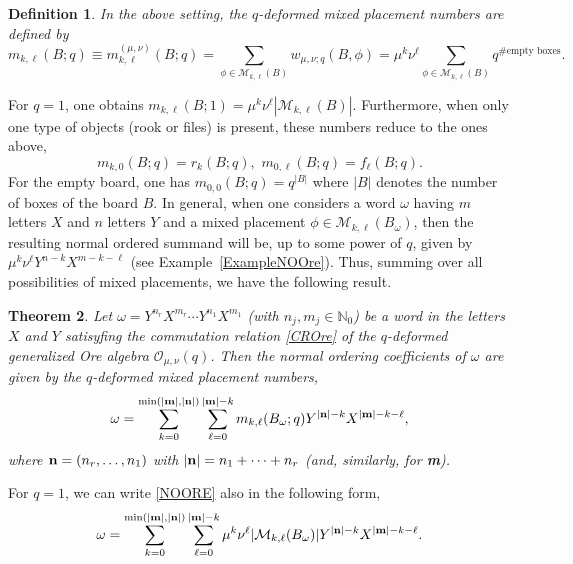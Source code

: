 \documentclass[10pt]{amsart}
\newtheorem{theorem}{Theorem}[section]%
\newtheorem{definition}[theorem]{Definition}
\begin{document}
\begin{definition}\label{DefOREMPN}
In the above setting, the {\em $q$-deformed mixed placement numbers} are defined by 
\begin{equation}
m_{k,\ell}(B;q)\equiv m_{k,\ell}^{(\mu,\nu)}(B;q)=\sum_{\phi \in \mathcal{M}_{k,\ell}(B)} w_{\mu,\nu;q}(B,\phi)=\mu^{k}\nu^{\ell}\sum_{\phi \in \mathcal{M}_{k,\ell}(B)} q^{\# \mbox{empty boxes}}.
\end{equation}
\end{definition}
For $q=1$, one obtains $ m_{k,\ell}(B;1)=\mu^{k}\nu^{\ell} |{\mathcal M}_{k,\ell}(B)| $. Furthermore, when only one type of objects (rook or files) is present, these numbers reduce to the ones above,
\begin{equation}\label{ORERed}
m_{k,0}(B;q)=r_k(B;q), \,\, m_{0,\ell}(B;q)=f_{\ell}(B;q).
\end{equation}
For the empty board, one has $m_{0,0}(B;q)=q^{|B|}$ where $|B|$ denotes the number of boxes of the board $B$. In general, when one considers a word $\omega$ having $m$ letters $X$ and $n$ letters $Y$ and a mixed placement $\phi \in  \mathcal{M}_{k,\ell}(B_{\omega}) $, then the resulting normal ordered summand will be, up to some power of $q$, given by $\mu^k \nu^{\ell}Y^{n-k}X^{m-k-\ell}$ (see Example~\ref{ExampleNOOre}). Thus, summing over all possibilities of mixed placements, we have the following result.
\begin{theorem}\label{THNOORE} Let $\omega=Y^{n_r}X^{m_r}\cdots Y^{n_1}X^{m_1}$ (with $n_j,m_j \in \mathbb{N}_0$) be a word in the letters $X$ and $Y$ satisyfing the commutation relation \eqref{CROre} of the $q$-deformed generalized Ore algebra ${\mathcal O}_{\mu,\nu}(q)$. Then the normal ordering coefficients of $\omega$ are given by the $q$-deformed mixed placement numbers,
\begin{equation}\label{NOORE}
\omega = \sum_{k=0}^{\min (|{\bf m}|,|{\bf n}|)}\sum_{\ell=0}^{|{\bf m}|-k} m_{k,\ell}(B_{\omega};q) Y^{|{\bf n}|-k}X^{|{\bf m}|-k-\ell},
\end{equation}
where ${\bf n}=(n_r,\ldots,n_1)$ with $|{\bf n}|=n_1+\cdots+n_r$ (and, similarly, for {\bf m}). 
\end{theorem}
For $q=1$, we can write \eqref{NOORE} also in the following form,
\begin{equation}\label{NOORE1}
\omega = \sum_{k=0}^{\min (|{\bf m}|,|{\bf n}|)}\sum_{\ell=0}^{|{\bf m}|-k} \mu^{k}\nu^{\ell} |{\mathcal M}_{k,\ell}(B_{\omega})| Y^{|{\bf n}|-k}X^{|{\bf m}|-k-\ell}.
\end{equation}
\end{document}
